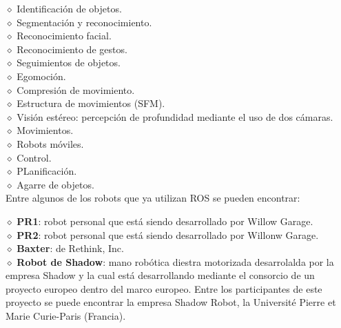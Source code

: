 \documentclass[letter,openrigth,12pt,spanish]{report}
\begin{document}
$\diamond$ Identificaci\'on de objetos.\\

$\diamond$ Segmentaci\'on y reconocimiento.\\

$\diamond$ Reconocimiento facial.\\

$\diamond$ Reconocimiento de gestos.\\

$\diamond$ Seguimientos de objetos.\\

$\diamond$ Egomoci\'on.\\

$\diamond$ Compresi\'on de movimiento.\\

$\diamond$ Estructura de movimientos (SFM).\\

$\diamond$ Visi\'on est\'ereo: percepci\'on de profundidad mediante el uso de dos c\'amaras.\\

$\diamond$ Movimientos.\\

$\diamond$ Robots m\'oviles.\\

$\diamond$ Control.\\

$\diamond$ PLanificaci\'on.\\

$\diamond$ Agarre de objetos.\\

Entre algunos de los robots que ya utilizan ROS se pueden encontrar:

$\diamond$ \textbf{PR1}: robot personal que est\'a siendo desarrollado por Willow Garage.\\

$\diamond$ \textbf{PR2}: robot personal que est\'a siendo desarrollado por Willonw Garage.\\

$\diamond$ \textbf{Baxter}: de Rethink, Inc.\\

$\diamond$ \textbf{Robot de Shadow}: mano rob\'otica diestra motorizada desarrolalda por la empresa Shadow y la cual est\'a desarrollando mediante el consorcio de un proyecto europeo dentro del marco europeo. Entre los participantes de este proyecto se puede encontrar la empresa Shadow Robot, la Universit\'e Pierre et Marie Curie-Paris (Francia).\\ 
\end{document}
